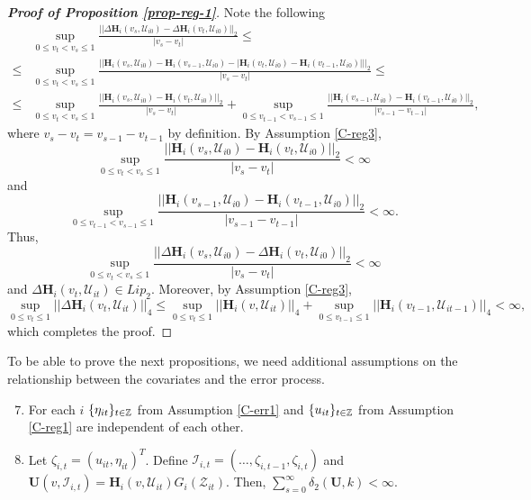 \documentclass[a4paper,12pt]{article}
\begin{document}
\begin{proof}[\textnormal{\textbf{Proof of Proposition \ref{prop-reg-1}}}]
Note the following 
\begin{align*}
&\sup_{0\leq v_t < v_s \leq 1} \frac{||\Delta \mathbf{H}_i(v_s, \mathcal{U}_{i0}) - \Delta \mathbf{H}_i(v_t, \mathcal{U}_{i0}) ||_2}{|v_s - v_t|} \leq \\
\leq &\sup_{0\leq v_t < v_s \leq 1} \frac{||\mathbf{H}_i(v_s, \mathcal{U}_{i0}) - \mathbf{H}_i(v_{s-1}, \mathcal{U}_{i0}) - |\mathbf{H}_i(v_t, \mathcal{U}_{i0}) - \mathbf{H}_i(v_{t-1}, \mathcal{U}_{i0})| ||_2}{|v_s - v_t|} \leq\\
\leq &\sup_{0\leq v_t < v_s \leq 1} \frac{||\mathbf{H}_i(v_s, \mathcal{U}_{i0}) - \mathbf{H}_i(v_t, \mathcal{U}_{i0}) ||_2}{|v_s - v_t|} + \sup_{0\leq v_{t-1} < v_{s-1} \leq 1} \frac{||\mathbf{H}_i(v_{s-1}, \mathcal{U}_{i0}) - \mathbf{H}_i(v_{t-1}, \mathcal{U}_{i0}) ||_2}{|v_{s-1} - v_{t-1}|},
\end{align*}
where $v_s - v_t = v_{s-1} - v_{t-1}$ by definition. By Assumption \ref{C-reg3},
\[\sup_{0\leq v_t < v_s \leq 1} \frac{||\mathbf{H}_i(v_s, \mathcal{U}_{i0}) - \mathbf{H}_i(v_t, \mathcal{U}_{i0}) ||_2}{|v_s - v_t|} < \infty
\]
and 
\[\sup_{0\leq v_{t-1} < v_{s-1} \leq 1} \frac{||\mathbf{H}_i(v_{s-1}, \mathcal{U}_{i0}) - \mathbf{H}_i(v_{t-1}, \mathcal{U}_{i0}) ||_2}{|v_{s-1} - v_{t-1}|} < \infty.
\]
Thus, 
\[
\sup_{0\leq v_t < v_s \leq 1} \frac{||\Delta \mathbf{H}_i(v_s, \mathcal{U}_{i0}) - \Delta \mathbf{H}_i(v_t, \mathcal{U}_{i0}) ||_2}{|v_s - v_t|} < \infty
\]
and $\Delta \mathbf{H}_i(v_t, \mathcal{U}_{it}) \in Lip_2$. Moreover, by Assumption \ref{C-reg3},
\[
 \sup_{0\leq v_t \leq 1} || \Delta \mathbf{H}_i(v_t, \mathcal{U}_{it})||_4 \leq  \sup_{0\leq v_t \leq 1} ||\mathbf{H}_i(v, \mathcal{U}_{it})||_4 +  \sup_{0\leq v_{t-1} \leq 1} || \mathbf{H}_i(v_{t-1}, \mathcal{U}_{it-1})||_4 < \infty,
\]
which completes the proof.
\end{proof} 

To be able to prove the next propositions, we need additional assumptions on the relationship between the covariates and the error process.

\begin{enumerate}[label=(C\arabic*),leftmargin=1.05cm]
\setcounter{enumi}{6}
\item \label{C-reg4} For each $i$ $\{\eta_{it}\}_{t\in\mathbb{Z}}$ from Assumption \ref{C-err1} and $\{u_{it}\}_{t\in\mathbb{Z}}$ from Assumption \ref{C-reg1} are independent of each other.
\item \label{C-reg5} Let $\zeta_{i, t} = (u_{it}, \eta_{it})^T$. Define $\mathcal{I}_{i, t} = (\ldots, \zeta_{i, t-1}, \zeta_{i, t})$ and $\mathbf{U}(v, \mathcal{I}_{i, t}) =  \mathbf{H}_i(v, \mathcal{U}_{it})G_i(\mathcal{Z}_{it})$. Then, $\sum_{s=0}^\infty \delta_2(\mathbf{U}, k)<\infty$.
\end{enumerate}
\end{document}
